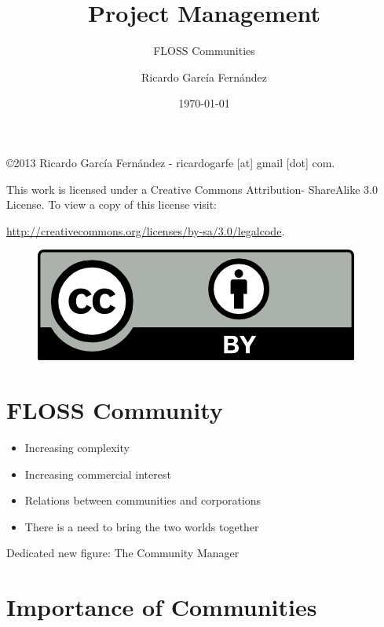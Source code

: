 \documentclass[11pt]{scrartcl}
\title{\textbf{Project Management}}
\subtitle{FLOSS Communities}
\author{Ricardo Garc\'ia Fern\'andez}
\date{\today}
\begin{document}
\maketitle

\vfill

\begin{flushright}
    \copyright  2013 Ricardo Garc\'ia Fern\'andez - ricardogarfe [at] gmail [dot] com.

    This work is licensed under a Creative Commons Attribution- ShareAlike 3.0 License.
    To view a copy of this license visit:
 
    \url{http://creativecommons.org/licenses/by-sa/3.0/legalcode}.
\end{flushright}

\begin{figure}[h]
    \begin{flushright}	
        \includegraphics{by}
        \label{fig:by-sa}
    \end{flushright}
\end{figure}

\newpage

\section{FLOSS Community}

\begin{itemize}
	\item Increasing complexity
	\item Increasing commercial interest
	\item Relations between communities and corporations
	\item There is a need to bring the two worlds together
\end{itemize}

\par Dedicated new figure: The Community Manager

\section{Importance of Communities}
\label{sec:importance}
\end{document}
